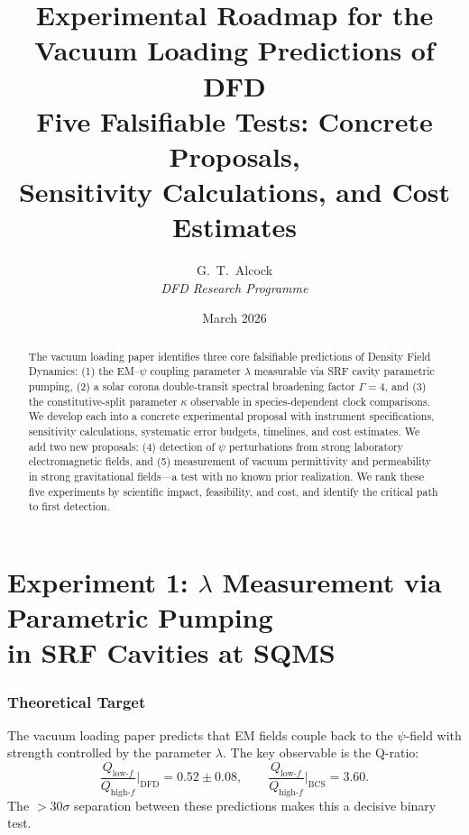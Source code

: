 \documentclass[11pt]{article}
\title{%
{\LARGE\bfseries Experimental Roadmap for the\\
Vacuum Loading Predictions of DFD}\\[12pt]
{\large Five Falsifiable Tests: Concrete Proposals,\\
Sensitivity Calculations, and Cost Estimates}
}
\author{G.~T.~Alcock\\
\textit{DFD Research Programme}}
\date{March 2026}
\begin{document}
\maketitle

\begin{abstract}
The vacuum loading paper identifies three core falsifiable predictions
of Density Field Dynamics: (1) the EM--$\psi$ coupling parameter
$\lambda$ measurable via SRF cavity parametric pumping, (2) a solar
corona double-transit spectral broadening factor $\Gamma = 4$, and
(3) the constitutive-split parameter $\kappa$ observable in
species-dependent clock comparisons.  We develop each into a concrete
experimental proposal with instrument specifications, sensitivity
calculations, systematic error budgets, timelines, and cost
estimates.  We add two new proposals: (4) detection of $\psi$
perturbations from strong laboratory electromagnetic fields, and
(5) measurement of vacuum permittivity and permeability in strong
gravitational fields---a test with no known prior realization.
We rank these five experiments by scientific impact, feasibility,
and cost, and identify the critical path to first detection.
\end{abstract}

\tableofcontents
\newpage


\part{Experiment 1: $\lambda$ Measurement via Parametric Pumping\\
in SRF Cavities at SQMS}
\label{part:srf}


\section{Theoretical Target}
\label{sec:srf-target}

The vacuum loading paper predicts that EM fields couple back to the
$\psi$-field with strength controlled by the parameter $\lambda$.
The key observable is the Q-ratio:
\begin{equation}
\frac{Q_{\text{low-}f}}{Q_{\text{high-}f}}\bigg|_{\text{DFD}}
= 0.52 \pm 0.08, \qquad
\frac{Q_{\text{low-}f}}{Q_{\text{high-}f}}\bigg|_{\text{BCS}}
= 3.60.
\label{eq:Q-ratio}
\end{equation}
The $>30\sigma$ separation between these predictions makes this a
decisive binary test.
\end{document}
